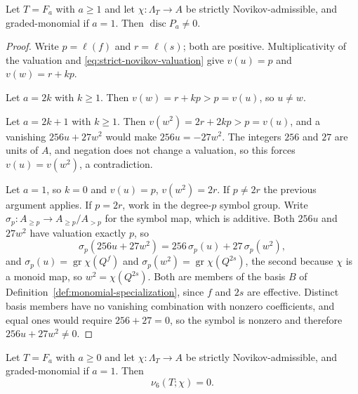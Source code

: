 \begin{lemma}
\label{lem:center-specialization-nondegenerate}
%
%
Let \(T=F_a\) with \(a\ge1\) and let \(\chi:\Lambda_T\to A\) be strictly
Novikov-admissible, and graded-monomial if \(a=1\).  Then
\(\operatorname{disc}P_a\ne0\).
\end{lemma}

\begin{proof}
Write \(p=\ell(f)\) and \(r=\ell(s)\); both are positive.  Multiplicativity of
the valuation and \eqref{eq:strict-novikov-valuation} give
\(v(u)=p\) and \(v(w)=r+kp\).

Let \(a=2k\) with \(k\ge1\).  Then \(v(w)=r+kp>p=v(u)\), so \(u\ne w\).

Let \(a=2k+1\) with \(k\ge1\).  Then \(v(w^2)=2r+2kp>p=v(u)\), and a vanishing
\(256u+27w^2\) would make \(256u=-27w^2\).  The integers \(256\) and \(27\) are
units of \(A\), and negation does not change a valuation, so this forces
\(v(u)=v(w^2)\), a contradiction.

Let \(a=1\), so \(k=0\) and \(v(u)=p\), \(v(w^2)=2r\).  If \(p\ne2r\) the
previous argument applies.  If \(p=2r\), work in the degree-\(p\) symbol
group.  Write \(\sigma_p:A_{\ge p}\to A_{\ge p}/A_{>p}\) for the symbol map,
which is additive.  Both \(256u\) and \(27w^2\) have valuation exactly \(p\), so
\[
 \sigma_p(256u+27w^2)=256\,\sigma_p(u)+27\,\sigma_p(w^2),
\]
and \(\sigma_p(u)=\operatorname{gr}\chi(Q^f)\) and
\(\sigma_p(w^2)=\operatorname{gr}\chi(Q^{2s})\), the second because \(\chi\) is
a monoid map, so \(w^2=\chi(Q^{2s})\).  Both are members of the basis \(B\) of
Definition~\ref{def:monomial-specialization}, since \(f\) and \(2s\) are
effective.  Distinct basis members have no vanishing combination with nonzero
coefficients, and equal ones would require \(256+27=0\), so the symbol is
nonzero and therefore \(256u+27w^2\ne0\).
\end{proof}

\begin{proposition}
\label{prop:hirzebruch-specialized-vanishing}
%
%
%
Let \(T=F_a\) with \(a\ge0\) and let \(\chi:\Lambda_T\to A\) be strictly
Novikov-admissible, and graded-monomial if \(a=1\).  Then
\[
 \nu_6(T;\chi)=0.
\]
\end{proposition}

